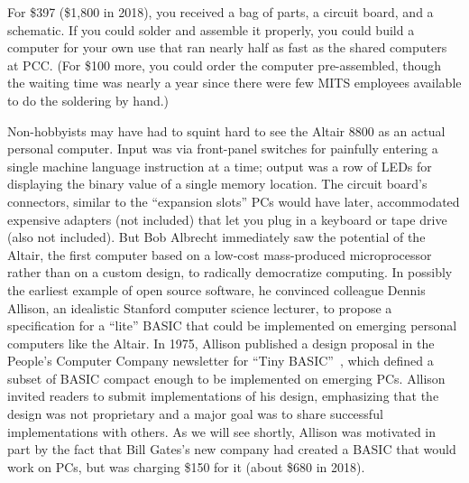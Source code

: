
For \$397 (\$1,800 in 2018), you received a bag of parts, a
circuit board, and a schematic.  If you could solder and assemble it properly, you 
could build a computer for your own use that ran nearly half as fast as the shared
computers at PCC.
(For \$100 more, you could
order the computer pre-assembled, though the waiting time was nearly a year since
there were few MITS employees available to do the soldering by hand.)


Non-hobbyists may have had to squint hard to see the Altair 8800 as an
actual personal computer.
Input was via front-panel switches for painfully entering a single
machine language instruction at a time; output was a row of LEDs for
displaying the binary value of a single memory location.
The circuit board's connectors, similar to the ``expansion slots'' PCs
would have later, accommodated expensive adapters (not included) that
let you plug in a keyboard or tape drive (also not included).
But Bob Albrecht immediately saw the potential of the Altair, the
first computer based on a low-cost mass-produced microprocessor rather
than on a custom design, to radically democratize computing.
In possibly the earliest example of open source software, he convinced
colleague Dennis Allison, an idealistic Stanford computer science
lecturer, to propose a specification for a ``lite'' BASIC that could
be implemented on emerging personal computers like the Altair.
In 1975, Allison published a design proposal in the People's Computer
Company newsletter for ``Tiny BASIC''~\cite{allison_tiny_basic}, which
defined
a subset of BASIC compact enough to be implemented on emerging PCs.
Allison invited readers to submit implementations of his design, 
emphasizing that the design was not proprietary and a major goal was to
share successful implementations with others.  As we will see shortly,
Allison was motivated in part by the fact that Bill Gates's new
company had created a BASIC that would work on PCs, but was charging
\$150 for it (about \$680 in 2018).


